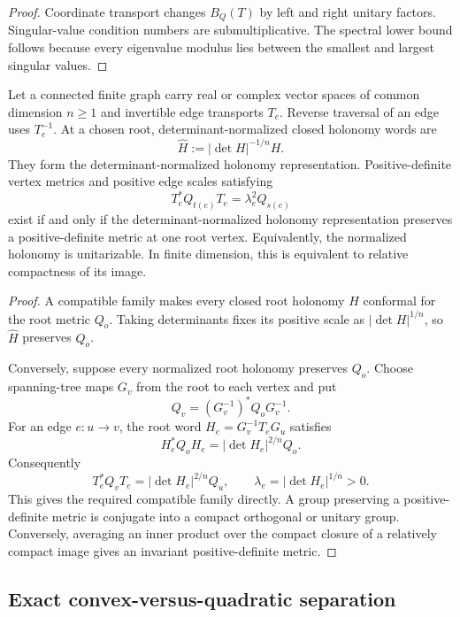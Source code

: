 \begin{proof}
Coordinate transport changes \(B_Q(T)\) by left and right unitary factors.  Singular-value condition numbers are submultiplicative.  The spectral lower bound follows because every eigenvalue modulus lies between the smallest and largest singular values.
\end{proof}

\begin{theorem}
\label{thm:block19-metric-completion}
Let a connected finite graph carry real or complex vector spaces of common
dimension \(n\geq1\) and invertible edge transports \(T_e\).  Reverse traversal
of an edge uses \(T_e^{-1}\).  At a chosen root, determinant-normalized closed
holonomy words are
\[
 \widehat H:=|\det H|^{-1/n}H.
\]
They form the determinant-normalized holonomy representation.  Positive-definite
vertex metrics and positive edge scales satisfying
\[
 T_e^*Q_{t(e)}T_e=\lambda_e^2Q_{s(e)}
\]
exist if and only if the determinant-normalized holonomy representation preserves a positive-definite metric at one root vertex.  Equivalently, the normalized holonomy is unitarizable.  In finite dimension, this is equivalent to relative compactness of its image.
\end{theorem}

\begin{proof}
A compatible family makes every closed root holonomy \(H\) conformal for the
root metric \(Q_o\).  Taking determinants fixes its positive scale as
\(|\det H|^{1/n}\), so \(\widehat H\) preserves \(Q_o\).

Conversely, suppose every normalized root holonomy preserves \(Q_o\).  Choose
spanning-tree maps \(G_v\) from the root to each vertex and put
\[
 Q_v=(G_v^{-1})^*Q_oG_v^{-1}.
\]
For an edge \(e:u\to v\), the root word \(H_e=G_v^{-1}T_eG_u\) satisfies
\[
 H_e^*Q_oH_e=|\det H_e|^{2/n}Q_o.
\]
Consequently
\[
 T_e^*Q_vT_e=|\det H_e|^{2/n}Q_u,
 \qquad \lambda_e=|\det H_e|^{1/n}>0.
\]
This gives the required compatible family directly.  A group preserving a
positive-definite metric is conjugate into a compact orthogonal or unitary
group.  Conversely, averaging an inner product over the compact closure of a
relatively compact image gives an invariant positive-definite metric.
\end{proof}

\subsection{Exact convex-versus-quadratic separation}
\label{subsec:block19-convex-quadratic}

